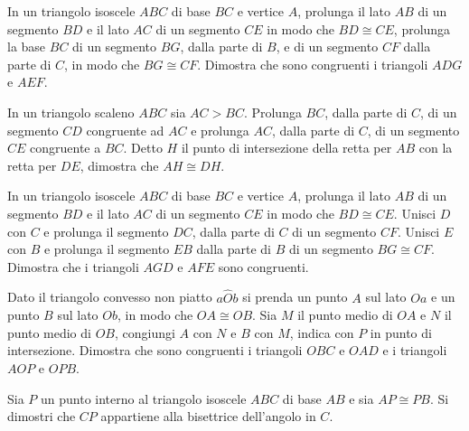 \begin{multicols}{2}
\begin{esercizio}
\label{ese:2.65}
In un triangolo isoscele \(ABC\) di base \(BC\) e vertice \(A\), prolunga 
il lato \(AB\) di un segmento \(BD\) e il lato \(AC\) di un segmento \(CE\) 
in modo che \(BD\cong CE\), prolunga la base \(BC\) di un segmento \(BG\), 
dalla parte di \(B\), e di un segmento \(CF\) dalla parte di \(C\), in modo 
che \(BG\cong CF\). Dimostra che sono congruenti i triangoli \(ADG\) e 
\(AEF\).
\end{esercizio}

\begin{esercizio}
\label{ese:2.66}
In un triangolo scaleno \(ABC\) sia \(AC>BC\). Prolunga \(BC\), dalla parte 
di \(C\), di un segmento \(CD\) congruente ad \(AC\) e prolunga \(AC\), dalla 
parte di \(C\), di un segmento \(CE\) congruente a \(BC\). Detto \(H\) il 
punto di intersezione della retta per \(AB\) con la retta per \(DE\), 
dimostra che \(AH\cong DH\).
\end{esercizio}

\begin{esercizio}
\label{ese:2.67}
In un triangolo isoscele \(ABC\) di base \(BC\) e vertice \(A\), prolunga 
il lato \(AB\) di un segmento \(BD\) e il lato \(AC\) di un segmento \(CE\) 
in modo che \(BD\cong CE\). Unisci \(D\) con \(C\) e prolunga il segmento 
\(DC\), dalla parte di \(C\) di un segmento \(CF\). Unisci \(E\) con \(B\) e 
prolunga il segmento \(EB\) dalla parte di \(B\) di un segmento \(BG\cong 
CF\). Dimostra che i triangoli \(AGD\) e \(AFE\) sono congruenti.
\end{esercizio}

\begin{esercizio}
\label{ese:2.68}
Dato il triangolo convesso non piatto \(a\widehat{O}b\) si prenda un 
punto \(A\) sul lato \(Oa\) e un punto \(B\) sul lato \(Ob\), in modo che 
\(OA\cong OB\). Sia \(M\) il punto medio di \(OA\) e \(N\) il punto medio di 
\(OB\), congiungi \(A\) con \(N\) e \(B\) con \(M\), indica con \(P\) in punto di 
intersezione. Dimostra che sono congruenti i triangoli \(OBC\) e \(OAD\) 
e i triangoli \(AOP\) e \(OPB\).
\end{esercizio}

\begin{esercizio}
\label{ese:2.71}
Sia \(P\) un punto interno al triangolo isoscele \(ABC\) di base \(AB\) e 
sia \(AP\cong PB\). Si dimostri che \(CP\) appartiene alla bisettrice 
dell'angolo in \(C\).
\end{esercizio}


\end{multicols}
